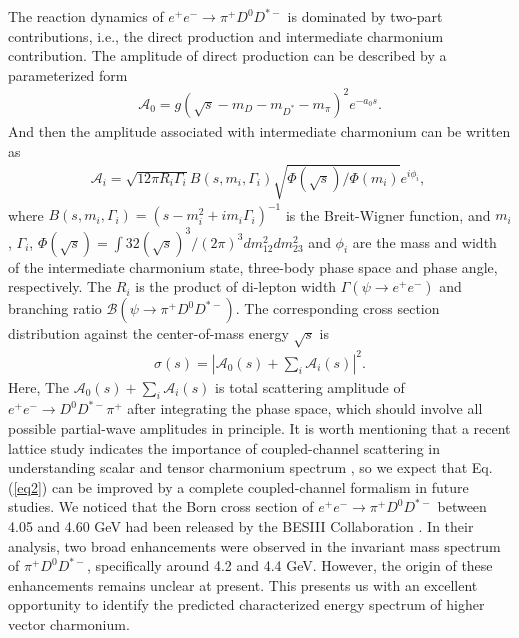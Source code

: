 \documentclass[final,5p,times,twocolumn]{elsarticle}
\begin{document}
The reaction dynamics of $e^+e^-\to \pi^+ D^0 D^{*-}$ is dominated by two-part contributions, i.e., the direct production and intermediate charmonium contribution. The amplitude of direct production can be described by a parameterized form 
\begin{eqnarray}
    \mathcal{A}_{0}=g\left(\sqrt{s}-m_D-m_{D^*}-m_{\pi}\right)^2e^{-a_0s}. \label{eq1}
\end{eqnarray}
And then the amplitude associated with intermediate charmonium can be written as  
\begin{eqnarray}
\mathcal{A}_{i}=\sqrt{12\pi R_i\Gamma_i}B(s,m_i,\Gamma_i)\sqrt{\Phi(\sqrt{s})/\Phi(m_i)}e^{i\phi_i},~ \label{eq:1}
\end{eqnarray}
where $B(s,m_i,\Gamma_i)=(s-m_i^2+im_i\Gamma_i)^{-1}$ is the Breit-Wigner function, and $m_i$, $\Gamma_i$, $\Phi(\sqrt{s})=\int32(\sqrt{s})^3/(2\pi)^3dm_{12}^2dm_{23}^2$ and $\phi_i$ are the mass and width of the intermediate charmonium state, three-body phase space and phase angle, respectively. The $R_i$ is the product of di-lepton width $\Gamma(\psi\to e^+e^-)$ and branching ratio $\mathcal{B}(\psi\to\pi^+ D^0 D^{*-})$. The corresponding cross section distribution against the center-of-mass energy $\sqrt{s}$ is 
\begin{eqnarray}   \sigma(s)=\left|\mathcal{A}_{0}(s)+\sum_i\mathcal{A}_{i}(s)\right|^2. \label{eq2}
\end{eqnarray}
{ Here, The $\mathcal{A}_0(s)+\sum_i\mathcal{A}_i(s)$ is total scattering amplitude of $e^+e^- \to D^0D^{*-}\pi^+$ after integrating the phase space, which should involve all possible partial-wave amplitudes in principle. It is worth mentioning that a recent lattice study indicates the importance of coupled-channel scattering in understanding scalar and tensor charmonium spectrum \cite{Wilson:2023hzu}, so we expect  that Eq. (\ref{eq2}) can be improved by a complete coupled-channel formalism in future studies. }
We noticed that the Born cross section of $e^+e^- \to\pi^+ D^0 D^{*-}$ between 4.05 and 4.60 GeV had been released by the BESIII Collaboration \cite{BESIII:2018iea}. In their analysis,  two broad enhancements were observed in the invariant mass spectrum of $\pi^+ D^0 D^{*-}$,  specifically around 4.2 and 4.4 GeV. However, the origin of these enhancements remains unclear at present. This presents us with an excellent opportunity to identify the predicted characterized energy spectrum of higher vector charmonium. %
\end{document}
